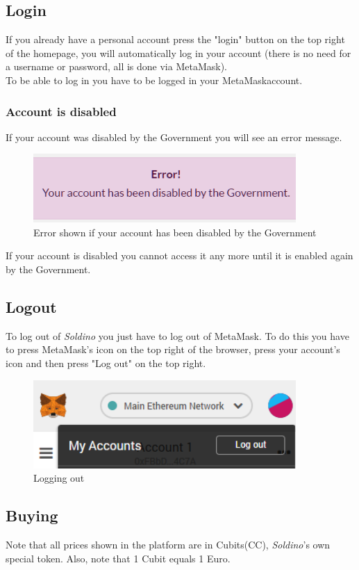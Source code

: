 	\subsection{Login}
	If you already have a personal account press the "login" button on the 
	top right of the homepage, you will automatically log in your account 
	(there is no need for a username or password, all is done via MetaMask). 
	\\To be able to log in you have to be logged in your MetaMask\glosp account.
		\subsubsection{Account is disabled}
		If your account was disabled by the Government you will see an error 
		message.
		\begin{figure}[H]
			\includegraphics[width=10cm]{res/images/user_disabled.png}
			\centering
			\caption{Error shown if your account has been disabled by the Government}
		\end{figure}
	\noindent If your account is disabled you cannot access it any more until it 
	is enabled again by the Government.
	\subsection{Logout}
	To log out of \textit{Soldino} you just have to log out of 
	MetaMask\glosp. To do this you have to press MetaMask's icon on the top 
	right of the browser, press your account's icon and then press "Log out"
	on the top right.
	\begin{figure}[H]
		\includegraphics[width=10cm]{res/images/logout_metamask.png}
		\centering
		\caption{Logging out}
	\end{figure}
	\subsection{Buying}
	Note that all prices shown in the platform are in Cubits\glosp (CC\glo), 
	\textit{Soldino}'s own special token. Also, note that 1 Cubit equals 1 Euro.
